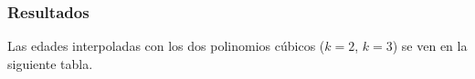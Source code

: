 \subsubsection{Resultados} 

Las edades interpoladas con los dos polinomios cúbicos ($k=2$, $k=3$) se ven en la siguiente tabla.

\begin{table}[htbp]
	\centering
\end{table}

